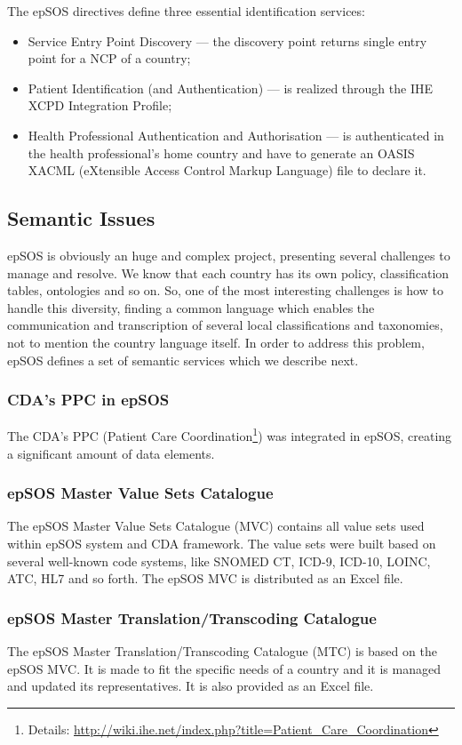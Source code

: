 The epSOS directives define three essential identification services:
\begin{itemize}
\item Service Entry Point Discovery --- the discovery point returns single entry point for a NCP of a country;
\item Patient Identification (and Authentication) --- is realized through the IHE XCPD Integration Profile;
\item Health Professional Authentication and Authorisation --- is authenticated in the health professional's home country and have to generate an OASIS XACML (eXtensible Access Control Markup Language) file to declare it.
\end{itemize}

\subsection{Semantic Issues}
epSOS is obviously an huge and complex project, presenting several challenges to manage and resolve. We know that each country has its own policy, classification tables, ontologies and so on. So, one of the most interesting challenges is how to handle this diversity, finding a common language which enables the communication and transcription of several local classifications and taxonomies, not to mention the country language itself. In order to address this problem, epSOS defines a set of semantic services which we describe next. 

\subsubsection{CDA's PPC in epSOS}
The CDA's PPC (Patient Care Coordination\footnote{Details: \url{http://wiki.ihe.net/index.php?title=Patient_Care_Coordination}}) was integrated in epSOS, creating a significant amount of data elements.

\subsubsection{epSOS Master Value Sets Catalogue}
The epSOS Master Value Sets Catalogue (MVC) contains all value sets used within epSOS system and CDA framework. The value sets were built based on several well-known code systems, like SNOMED CT, ICD-9, ICD-10, LOINC, ATC, HL7 and so forth. The epSOS MVC is distributed as an Excel file.

\subsubsection{epSOS Master Translation/Transcoding Catalogue}
The epSOS Master Translation/Transcoding Catalogue (MTC) is based on the epSOS MVC. It is made to fit the specific needs of a country and it is managed and updated its representatives. It is also provided as an Excel file.

